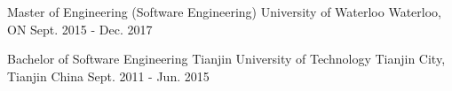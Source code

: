 \vspace{-0.8em}
\begin{cventries}
  \cventry
    {Master of Engineering (Software Engineering)}
    {University of Waterloo}
    {Waterloo, ON}
    {Sept. 2015 - Dec. 2017}
    {
      \begin{cvitems}
      \end{cvitems}
    }
    \cventry
    {Bachelor of Software Engineering}
    {Tianjin University of Technology}
    {Tianjin City, Tianjin China}
    {Sept. 2011 - Jun. 2015}
    {
      \begin{cvitems}
      \end{cvitems}
    }
\end{cventries}
